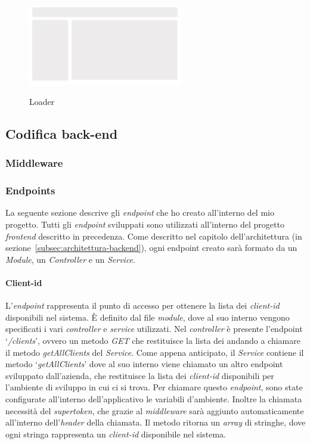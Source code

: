 \begin{figure}[ht]
  \centering
  \includegraphics[width=0.6\textwidth, alt={Skeleton loader di caricamento principale dell'applicazione}]{images/frontend/Loader.jpg}
  \caption{Loader}\label{fig:loader}
\end{figure}
\pagebreak

\subsection{Codifica back-end}\label{subsec:codifica-back-end}

\subsubsection{Middleware}\label{subsubsec:middleware}


\subsubsection{Endpoints}\label{subsubsec:endpoints}
La seguente sezione descrive gli \textit{endpoint} che ho creato all'interno del mio progetto. Tutti gli \textit{endpoint} sviluppati 
sono utilizzati all'interno del progetto \textit{frontend} descritto in precedenza.
Come descritto nel capitolo dell'architettura (in sezione~\ref{subsec:architettura-backend}), ogni endpoint creato sarà formato da un \textit{Module}, un \textit{Controller} e un \textit{Service}.

\paragraph{Client-id}
L'\textit{endpoint} rappresenta il punto di accesso per ottenere la lista dei \textit{client-id} disponibili nel sistema.
È definito dal file \textit{module}, dove al suo interno vengono specificati i vari \textit{controller} e \textit{service} utilizzati.
Nel \textit{controller} è presente l'endpoint `\textit{/clients}', ovvero un metodo \textit{GET} che restituisce la lista dei  andando
a chiamare il metodo \textit{getAllClients} del \textit{Service}.
Come appena anticipato, il \textit{Service} contiene il metodo `\textit{getAllClients}' dove al suo interno viene chiamato un altro endpoint sviluppato dall'azienda, che restituisce 
la lista dei \textit{client-id} disponibili per l'ambiente di sviluppo in cui ci si trova.
Per chiamare questo \textit{endpoint}, sono state configurate all'interno dell'applicativo le variabili d'ambiente.
Inoltre la chiamata necessità del \textit{supertoken}, che grazie al \textit{middleware} sarà aggiunto automaticamente all'interno 
dell'\textit{header} della chiamata.
Il metodo ritorna un \textit{array} di stringhe, dove ogni stringa rappresenta un \textit{client-id} disponibile nel sistema.

